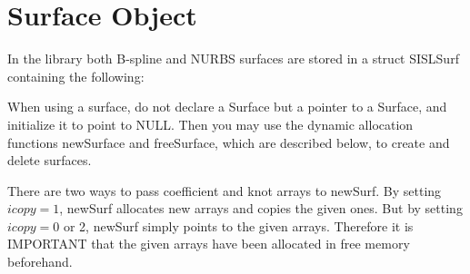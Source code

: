 \section{\label{surfaceobject}Surface Object}

In the library both B-spline and NURBS surfaces are stored in a struct SISLSurf containing
the following:

When using a surface, do not declare a Surface but a pointer to a Surface,
and initialize it to point to NULL. Then you may use the
dynamic allocation functions newSurface and freeSurface, which are described below,
to create and delete surfaces.

There are two ways to pass coefficient and knot arrays
to newSurf.
By setting $icopy=1$, newSurf
allocates new arrays and copies the given ones.
But by setting $icopy=0$ or 2, newSurf simply points
to the given arrays. Therefore it is IMPORTANT that the
given arrays have been allocated in free memory beforehand.
\pgsbreak

\pgsbreak

\pgsbreak

